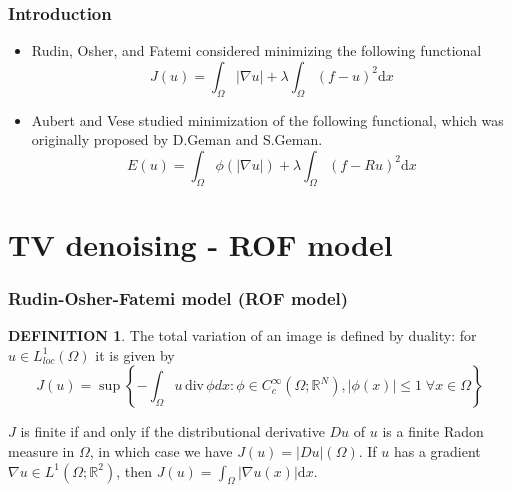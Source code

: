 \documentclass[notheorems,mathserif,table,compress]{beamer}  %
\begin{document}
%
\begin{frame}
\frametitle{Introduction}
\begin{itemize}
\item Rudin, Osher, and Fatemi considered minimizing the following functional
\newcommand{\ud}{\mathrm{d}}
\begin{displaymath}
J(u)=\int_{\Omega}|\nabla u|+\lambda \int_{\Omega}(f-u)^2\ud x
\end{displaymath}

\item Aubert and Vese studied minimization of the following functional, which was originally proposed by D.Geman and S.Geman.
\begin{displaymath}
E(u)=\int_{\Omega}\phi(|\nabla u|)+\lambda \int_{\Omega}(f-Ru)^2\ud x
\end{displaymath}

\end{itemize}
\end{frame}

\section{TV denoising - ROF model}

%
\begin{frame}
\frametitle{Rudin-Osher-Fatemi model (ROF model)} 
\theoremstyle{definition}
\newtheorem{theorem}{DEFINITION}
\begin{theorem}
The total variation of an image is defined by duality: for $u\in L^1_{loc}(\Omega)$ it is given by
\begin{displaymath}
J(u)=\sup \left\{-\int_{\Omega}u \,\textrm{div} \,\phi dx:\phi \in C_c^\infty(\Omega;\mathbb{R}^N),|\phi(x)|\leq1 \; \forall x\in \Omega \right\}
\end{displaymath}

\end{theorem}
\newcommand{\ud}{\mathrm{d}}
$J$ is finite if and only if the distributional derivative $Du$ of $u$ is a finite Radon measure in $\Omega$, in which case we have $J(u)=|Du|(\Omega)$. If $u$ has a gradient $\nabla u\in L^1(\Omega;\mathbb{R}^2)$, then $J(u)=\displaystyle\int_{\Omega}|\nabla u(x)|\ud x$.
\end{frame}
\end{document}
